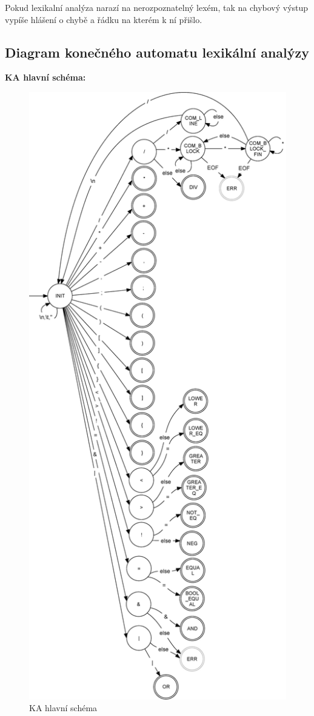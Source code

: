 \documentclass[a4paper,11pt]{article}
\begin{document}
Pokud lexikalní analýza narazí na nerozpoznatelný lexém, tak na chybový výstup vypíše hlášení o chybě a řádku na kterém k ní přišlo.
\newpage
\subsection{Diagram konečného automatu lexikální analýzy}
\textbf{KA hlavní schéma:} %
\begin{figure}[H]
\centering
\includegraphics[scale=.31]{FSM_MAIN.eps}
\caption{KA hlavní schéma}
\end{figure}
\end{document}
